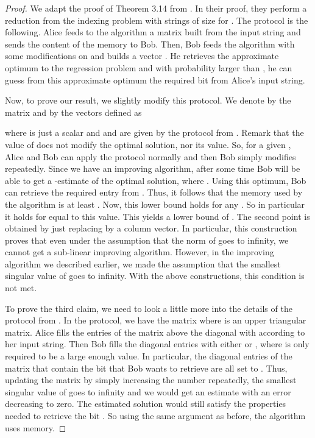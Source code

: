 \documentclass[a4paper,11pt,oneside,english,onecolumn]{article}
\theoremstyle{definition}
\begin{document}
\begin{proof}
We adapt the proof of Theorem 3.14 from \cite{LinAlgStream}. In their proof, they perform a reduction from the indexing problem with strings of size  for . The protocol is the following. Alice feeds to the algorithm a matrix  built from the input string and sends the content of the memory to Bob. Then, Bob feeds the algorithm with some modifications on  and builds a vector .
He retrieves the approximate optimum to the regression problem  and with probability larger than , he can guess from this approximate optimum the required bit from Alice's input string.

Now, to prove our result, we slightly modify this protocol. We denote by  the matrix and by  the vectors defined as 

where  is just a scalar and  and  are given by the protocol from \cite{LinAlgStream}. Remark that the value of  does not modify the optimal solution, nor its value. So, for a given , Alice and Bob can apply the protocol normally and then Bob simply modifies  repeatedly. Since we have an improving algorithm, after some time Bob will be able to get a -estimate of the optimal solution, where . Using this optimum, Bob can retrieve the required entry from . Thus, it follows that the memory used by the algorithm is at least . Now, this lower bound holds for any . So in particular it holds for  equal to this value. This yields a lower bound of . The second point is obtained by just replacing  by a column vector. In particular, this construction proves that even under the assumption that the norm of  goes to infinity, we cannot get a sub-linear improving algorithm. However, in the improving algorithm we described earlier, we made the assumption that the smallest singular value of  goes to infinity. With the above constructions, this condition is not met.

To prove the third claim, we need to look a little more into the details of the protocol from \cite{LinAlgStream}. In the protocol, we have the matrix 
where  is an upper triangular matrix. Alice fills the entries of the matrix above the diagonal with  according to her input string. Then Bob fills the diagonal entries with either  or , where  is only required to be a large enough value. In particular, the diagonal entries of the matrix that contain the bit that Bob wants to retrieve are all set to . Thus, updating the matrix by simply increasing the number  repeatedly, the smallest singular value of  goes to infinity and we would get an estimate with an error decreasing to zero. The estimated solution would still satisfy the properties needed to retrieve the bit . So using the same argument as before, the algorithm uses  memory.
\end{proof}
\end{document}

